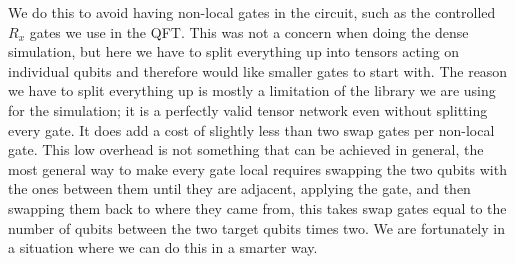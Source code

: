 \noindent
We do this to avoid having non-local gates in the circuit, such as the controlled $R_x$ gates we use in the QFT. This was not a concern when doing the dense simulation, but here we have to split everything up into tensors acting on individual qubits and therefore would like smaller gates to start with. The reason we have to split everything up is mostly a limitation of the library\cite{quimb} we are using for the simulation; it is a perfectly valid tensor network even without splitting every gate. It does add a cost of slightly less than two swap gates per non-local gate.  
This low overhead is not something that can be achieved in general, the most general way to make every gate local requires swapping the two qubits with the ones between them until they are adjacent, applying the gate, and then swapping them back to where they came from, this takes swap gates equal to the number of qubits between the two target qubits times two. We are fortunately in a situation where we can do this in a smarter way. 
